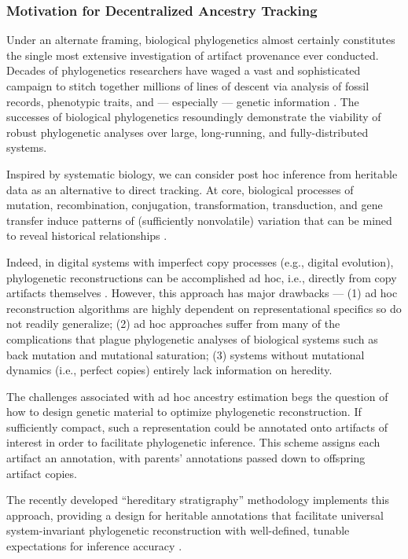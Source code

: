 \subsubsection{Motivation for Decentralized Ancestry Tracking}

Under an alternate framing, biological phylogenetics almost certainly constitutes the single most extensive investigation of artifact provenance ever conducted.
Decades of phylogenetics researchers have waged a vast and sophisticated campaign to stitch together millions of lines of descent via analysis of fossil records, phenotypic traits, and --- especially --- genetic information \citep{hinchliff2015synthesis,lee2015morphological}.
The successes of biological phylogenetics resoundingly demonstrate the viability of robust phylogenetic analyses over large, long-running, and fully-distributed systems.

Inspired by systematic biology, we can consider post hoc inference from heritable data as an alternative to direct tracking.
At core, biological processes of mutation, recombination, conjugation, transformation, transduction, and gene transfer induce patterns of (sufficiently nonvolatile) variation that can be mined to reveal historical relationships \citep{davis1992populations}.

Indeed, in digital systems with imperfect copy processes (e.g., digital evolution), phylogenetic reconstructions can be accomplished ad hoc, i.e., directly from copy artifacts themselves \citep{moreno2021case}.
However, this approach has major drawbacks ---
(1) ad hoc reconstruction algorithms are highly dependent on representational specifics so do not readily generalize;
(2) ad hoc approaches suffer from many of the complications that plague phylogenetic analyses of biological systems such as back mutation and mutational saturation;
(3) systems without mutational dynamics (i.e., perfect copies) entirely lack information on heredity.

The challenges associated with ad hoc ancestry estimation begs the question of how to design genetic material to optimize phylogenetic reconstruction.
If sufficiently compact, such a representation could be annotated onto artifacts of interest in order to facilitate phylogenetic inference.
This scheme assigns each artifact an annotation, with parents' annotations passed down to offspring artifact copies.

The recently developed ``hereditary stratigraphy'' methodology implements this approach, providing a design for heritable annotations that facilitate universal system-invariant phylogenetic reconstruction with well-defined, tunable expectations for inference accuracy \citep{moreno2022hereditary}.

